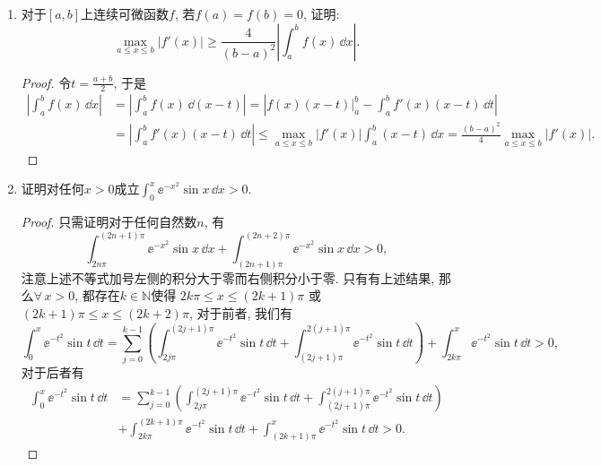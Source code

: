 \begin{quiza}
\begin{enumerate}
\begin{proof}[解答]
(5)我们有\[\int_{0}^{\pi/2}\frac{\sin x\cos x}{\sin x+\cos x}\dd x
=\int_{0}^{\pi/2}\frac{\left(\sin x+\cos x\right)^2-1}{2(\sin x+\cos x)}\,\dd x,\]
于是\[\begin{split}
\quad\int_{0}^{\pi/2}\frac{\left(\sin x+\cos x\right)^2-1}{2(\sin x+\cos x)}\,\dd x
&=\frac{1}{2}\int_{0}^{\pi/2}(\sin x+\cos x)\,\dd x
-\frac{1}{2}\int_{0}^{\pi/2}\frac{1}{\sin x+\cos x}\,\dd x\\
&=1-\frac{1}{2}\int_{0}^{\pi/2}\frac{1}{\sqrt{2}}\csc \left(x+\frac{\pi}{4}\right)\dd x\\
&=1-\frac{1}{2\sqrt{2}}\int_{\pi/4}^{3\pi/4}\csc x\,\dd x\\
&=1-\frac{1}{2\sqrt{2}}\ln\left(\frac{2+\sqrt{2}}{2-\sqrt{2}}\right).
\end{split}\]
\end{proof}

\item 对于\([a,b]\)上连续可微函数\(f\), 若\(f(a)=f(b)=0\), 证明:
\[\max_{a\leqslant x\leqslant b}|f'(x)|
\geqslant\frac{4}{(b-a)^2}\left|\int_{a}^{b}f(x)\,\dd x\right|.\]
\begin{proof}
令\(t=\frac{a+b}{2}\), 于是
\[\begin{split}
\left|\int_{a}^{b}f(x)\,\dd x\right|&=\left|\int_{a}^{b}f(x)\,\dd (x-t)\right|
=\left|f(x)(x-t)\big|^b_a-\int_{a}^{b}f'(x)(x-t)\,\dd t\right|\\
&=\left|\int_{a}^{b}f'(x)(x-t)\,\dd t\right|
\leqslant \max_{a\leqslant x\leqslant b}|f'(x)|\int_{a}^{b}(x-t)\,\dd x
=\frac{(b-a)^2}{4}\max_{a\leqslant x\leqslant b}|f'(x)|.
\end{split}\]
\end{proof}

\item 证明对任何\(x>0\)成立\(\int_{0}^{x}\ee^{-x^2}\sin x\,\dd x>0.\)
\begin{proof}
只需证明对于任何自然数\(n\), 有\[\int_{2n\pi}^{(2n+1)\pi}\ee^{-x^2}\sin x\,\dd x
+\int_{(2n+1)\pi}^{(2n+2)\pi}\ee^{-x^2}\sin x\,\dd x>0,\]
注意上述不等式加号左侧的积分大于零而右侧积分小于零. 
只有有上述结果, 那么\(\forall\, x> 0\), 都存在\(k\in\mathbb{N}\)使得
\(2k\pi\leqslant x\leqslant (2k+1)\pi\)
或\((2k+1)\pi\leqslant x\leqslant (2k+2)\pi\), 对于前者, 我们有
\[\int_{0}^{x}\ee^{-t^2}\sin t\,\dd t
=\sum_{j=0}^{k-1}\left(\int_{2j\pi}^{\left(2j+1\right)\pi}\ee^{-t^2}\sin t\,\dd t
+\int_{\left(2j+1\right)\pi}^{2\left(j+1\right)\pi}\ee^{-t^2}\sin t\,\dd t\right)
+\int_{2k\pi}^{x}\ee^{-t^2}\sin t\,\dd t>0,\]对于后者有
\[\begin{split}
\int_{0}^{x}\ee^{-t^2}\sin t\,\dd t
&=\sum_{j=0}^{k-1}\left(\int_{2j\pi}^{\left(2j+1\right)\pi}\ee^{-t^2}\sin t\,\dd t
+\int_{\left(2j+1\right)\pi}^{2\left(j+1\right)\pi}\ee^{-t^2}\sin t\,\dd t\right)\\
&+\int_{2k\pi}^{(2k+1)\pi}\ee^{-t^2}\sin t\,\dd t
+\int_{(2k+1)\pi}^{x}\ee^{-t^2}\sin t\,\dd t>0.
\end{split}\]


\end{proof}
\end{enumerate}
\end{quiza}
